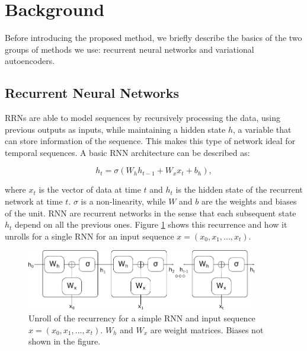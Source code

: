 \section{Background}
\label{rnn:background}
Before introducing the proposed method, we briefly describe the basics of the two groups of methods we use: recurrent neural networks and variational autoencoders.

\subsection{Recurrent Neural Networks}

RRNs are able to model sequences by recursively processing the data, using previous outputs as inputs, while maintaining a hidden state $h$, a variable that can store information of the sequence. This makes this type of network ideal for temporal sequences. A basic RNN architecture can be described as:

\begin{equation}
    h_t = \mathit{\sigma}(W_h h_{t-1} + W_x x_{t} + b_h),
\end{equation}

where $x_t$ is the vector of data at time $t$ and $h_{t}$ is the hidden state of the recurrent network at time $t$. $\sigma$ is a non-linearity, while $W$ and $b$ are the weights and biases of the unit. RNN are recurrent networks in the sense that each subsequent state $h_t$ depend on all the previous ones. Figure \ref{fig:rnnvae:rnn} shows this recurrence and how it unrolls for a single RNN for an input sequence $x = (x_0,x_1, ..., x_t)$. \\

\begin{figure}[!htbp]
  \centering
  \includegraphics[width=0.9\textwidth]{figures/rnnvae/rnn-fig.pdf}
  \caption[Unroll of the recurrency for a basic RNN.]{Unroll of the recurrency for a simple RNN and input sequence $x = (x_0,x_1, ..., x_t)$. $W_h$ and $W_x$ are weight matrices. Biases not shown in the figure.}\label{fig:rnnvae:rnn}
\end{figure}

